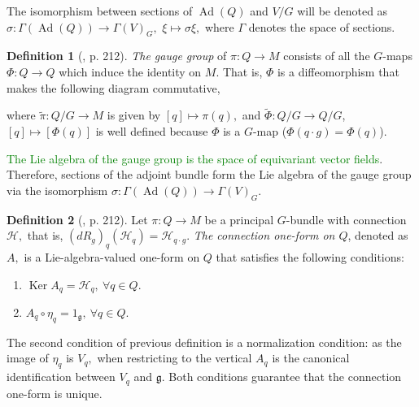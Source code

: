 \documentclass[12pt, letterpaper, reqno]{amsart}
\theoremstyle{definition}
\newtheorem{df}{Definition}
\theoremstyle{plain}
\theoremstyle{remark}
\begin{document}
The isomorphism between sections of $ \operatorname{Ad} (Q) $ and $ V/G $ will be denoted as $ \sigma: \Gamma( \operatorname{Ad} (Q)) \rightarrow \Gamma(V)_G, $ $ \xi \mapsto \sigma\xi, $ where $ \Gamma $ denotes the space of sections.

\begin{df}[\cite{montgomery2002tour}, p. 212]
	\textit{The gauge group} of $ \pi: Q \rightarrow M $ consists of all the $ G $-maps $ \Phi: Q \rightarrow  Q$ which induce the identity on $ M. $ That is, $ \Phi $ is a diffeomorphism that makes the following diagram commutative,
	\begin{center}
	\end{center}

	where $ \tilde\pi: Q/G \rightarrow M $ is given by $ [q] \mapsto \pi(q), $ and $ \tilde\Phi: Q/G \rightarrow Q/G $, $ [q] \mapsto [\Phi(q)]  $ is well defined because $ \Phi $ is a $ G $-map ($\Phi(q\cdot g) = \Phi(q)$).    
\end{df}
\textcolor{green}{The Lie algebra of the gauge group is the space of equivariant vector fields}. Therefore, sections of the adjoint bundle form the Lie algebra of the gauge group via the isomorphism $ \sigma: \Gamma( \operatorname{Ad} (Q)) \rightarrow  \Gamma(V)_G. $ 

\begin{df}[\cite{montgomery2002tour}, p. 212]
	Let $ \pi:Q \rightarrow M $ be a principal $ G $-bundle with connection $ \mathcal{H}, $ that is, $ (dR_g)_q( \mathcal{H}_q) = \mathcal{H}_{q\cdot g}. $ \textit{The connection one-form on $ Q $}, denoted as $ A, $ is a Lie-algebra-valued one-form on $ Q $ that satisfies the following conditions:

	\begin{enumerate}
		\item $ \operatorname{Ker} A_q = \mathcal{H}_q, \ \forall q\in Q. $ 
		\item $ A_q \circ \eta_q = 1_{ \mathfrak{g}}, \ \forall q\in Q. $ 
	\end{enumerate}
\end{df}
The second condition of previous definition is a normalization condition: as the image of $ \eta_q $ is $ V_q, $ when restricting to the vertical $ A_q $ is the canonical identification between $ V_q $ and $ \mathfrak{g} $. Both conditions guarantee that the connection one-form is unique. 

\nocite{*}

\end{document}
